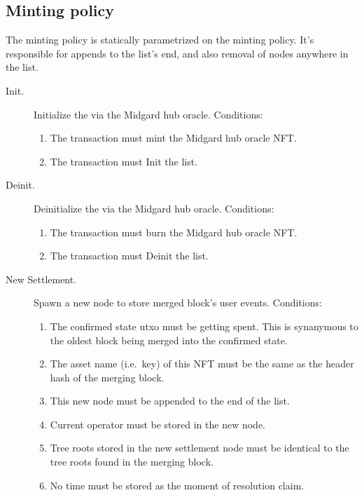 \documentclass[../midgard.tex]{subfiles}
\begin{document}
\subsection{Minting policy}
\label{h:settlement-queue-minting-policy}

The  minting policy is statically parametrized on the  minting policy. It's responsible for appends to the  list's end, and also removal of nodes anywhere in the list.
\begin{description}
    \item[Init.] Initialize the  via the Midgard hub oracle.
      Conditions:
        \begin{enumerate}
            \item The transaction must mint the Midgard hub oracle NFT.
            \item The transaction must Init the  list.
        \end{enumerate}
    \item[Deinit.] Deinitialize the  via the Midgard hub oracle.
      Conditions:
        \begin{enumerate}
            \item The transaction must burn the Midgard hub oracle NFT.
            \item The transaction must Deinit the  list.
        \end{enumerate}
    \item[New Settlement.] Spawn a new node to store merged block's user events.
      Conditions:
        \begin{enumerate}
            \item The confirmed state utxo must be getting spent. This is synanymous to the oldest block being merged into the confirmed state.
            \item The asset name (i.e.\ key) of this NFT must be the same as the header hash of the merging block.
            \item This new node must be appended to the end of the  list.
            \item Current operator must be stored in the new node.
            \item Tree roots stored in the new settlement node must be identical to the tree roots found in the merging block.
            \item No time must be stored as the moment of resolution claim.

\end{enumerate}
\end{description}
\end{document}
